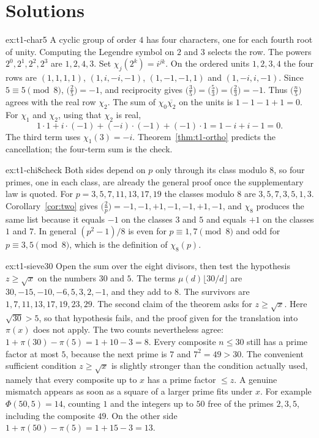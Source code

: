 \section{Solutions}

\begin{solution}{ex:t1-char5}
\idea A cyclic group of order $4$ has four characters, one for each fourth root of unity. Computing the Legendre symbol on $2$ and $3$ selects the row.
\writeup The powers $2^0,2^1,2^2,2^3$ are $1,2,4,3$. Set $\chi_j(2^k)=i^{jk}$. On the ordered units $1,2,3,4$ the four rows are $(1,1,1,1)$, $(1,i,-i,-1)$, $(1,-1,-1,1)$ and $(1,-i,i,-1)$. Since $5\equiv5\pmod8$, $\bigl(\frac25\bigr)=-1$, and reciprocity gives $\bigl(\frac35\bigr)=\bigl(\frac53\bigr)=\bigl(\frac23\bigr)=-1$. Thus $\bigl(\frac n5\bigr)$ agrees with the real row $\chi_2$. The sum of $\chi_0\overline{\chi_2}$ on the units is $1-1-1+1=0$. For $\chi_1$ and $\chi_2$, using that $\chi_2$ is real,
\[
1\cdot1+i\cdot(-1)+(-i)\cdot(-1)+(-1)\cdot1=1-i+i-1=0.
\]
The third term uses $\chi_1(3)=-i$. Theorem~\ref{thm:t1-ortho} predicts the cancellation; the four-term sum is the check.
\end{solution}

\begin{solution}{ex:t1-chi8check}
\idea Both sides depend on $p$ only through its class modulo $8$, so four primes, one in each class, are already the general proof once the supplementary law is quoted.
\writeup For $p=3,5,7,11,13,17,19$ the classes modulo $8$ are $3,5,7,3,5,1,3$. Corollary~\ref{cor:two} gives $\bigl(\frac2p\bigr)=-1,-1,+1,-1,-1,+1,-1$, and $\chi_8$ produces the same list because it equals $-1$ on the classes $3$ and $5$ and equals $+1$ on the classes $1$ and $7$. In general $(p^2-1)/8$ is even for $p\equiv1,7\pmod8$ and odd for $p\equiv3,5\pmod8$, which is the definition of $\chi_8(p)$.
\end{solution}

\begin{solution}{ex:t1-sieve30}
\idea Open the sum over the eight divisors, then test the hypothesis $z\ge\sqrt x$ on the numbers $30$ and $5$.
\writeup The terms $\mu(d)\lfloor30/d\rfloor$ are $30,-15,-10,-6,5,3,2,-1$, and they add to $8$. The survivors are $1,7,11,13,17,19,23,29$. The second claim of the theorem asks for $z\ge\sqrt x$. Here $\sqrt{30}>5$, so that hypothesis fails, and the proof given for the translation into $\pi(x)$ does not apply. The two counts nevertheless agree: $1+\pi(30)-\pi(5)=1+10-3=8$. Every composite $n\le30$ still has a prime factor at most $5$, because the next prime is $7$ and $7^2=49>30$. The convenient sufficient condition $z\ge\sqrt x$ is slightly stronger than the condition actually used, namely that every composite up to $x$ has a prime factor $\le z$. A genuine mismatch appears as soon as a square of a larger prime fits under $x$. For example $\Phi(50,5)=14$, counting $1$ and the integers up to $50$ free of the primes $2,3,5$, including the composite $49$. On the other side $1+\pi(50)-\pi(5)=1+15-3=13$.
\end{solution}

